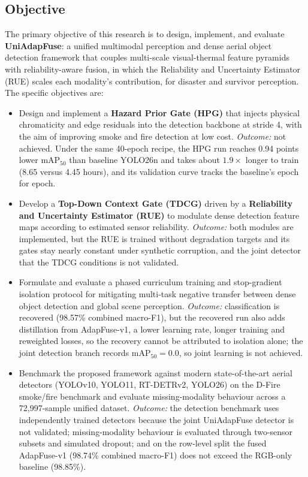 \documentclass[journal]{IEEEtran}
\begin{document}
\subsection{Objective}

The primary objective of this research is to design, implement, and evaluate \textbf{UniAdapFuse}: a unified multimodal perception and dense aerial object detection framework that couples multi-scale visual-thermal feature pyramids with reliability-aware fusion, in which the Reliability and Uncertainty Estimator (RUE) scales each modality's contribution, for disaster and survivor perception. The specific objectives are:

\begin{itemize}
    \item Design and implement a \textbf{Hazard Prior Gate (HPG)} that injects physical chromaticity and edge residuals into the detection backbone at stride 4, with the aim of improving smoke and fire detection at low cost. \textit{Outcome:} not achieved. Under the same 40-epoch recipe, the HPG run reaches 0.94 points lower $\mathrm{mAP}_{50}$ than baseline YOLO26n and takes about $1.9\times$ longer to train (8.65 versus 4.45 hours), and its validation curve tracks the baseline's epoch for epoch.
    \item Develop a \textbf{Top-Down Context Gate (TDCG)} driven by a \textbf{Reliability and Uncertainty Estimator (RUE)} to modulate dense detection feature maps according to estimated sensor reliability. \textit{Outcome:} both modules are implemented, but the RUE is trained without degradation targets and its gates stay nearly constant under synthetic corruption, and the joint detector that the TDCG conditions is not validated.
    \item Formulate and evaluate a phased curriculum training and stop-gradient isolation protocol for mitigating multi-task negative transfer between dense object detection and global scene perception. \textit{Outcome:} classification is recovered (98.57\% combined macro-F1), but the recovered run also adds distillation from AdapFuse-v1, a lower learning rate, longer training and reweighted losses, so the recovery cannot be attributed to isolation alone; the joint detection branch records $\mathrm{mAP}_{50}=0.0$, so joint learning is not achieved.
    \item Benchmark the proposed framework against modern state-of-the-art aerial detectors (YOLOv10, YOLO11, RT-DETRv2, YOLO26) on the D-Fire smoke/fire benchmark and evaluate missing-modality behaviour across a 72,997-sample unified dataset. \textit{Outcome:} the detection benchmark uses independently trained detectors because the joint UniAdapFuse detector is not validated; missing-modality behaviour is evaluated through two-sensor subsets and simulated dropout; and on the row-level split the fused AdapFuse-v1 (98.74\% combined macro-F1) does not exceed the RGB-only baseline (98.85\%).

\end{itemize}
\end{document}
